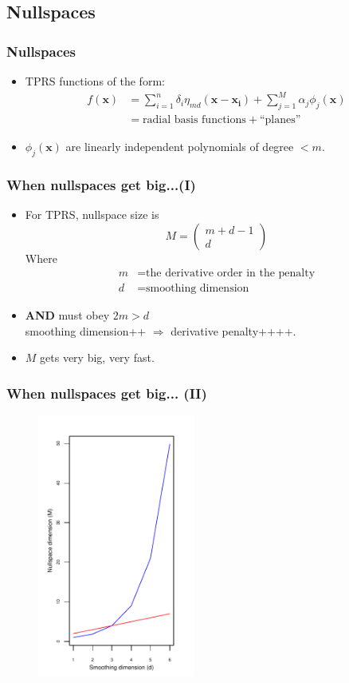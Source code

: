 \documentclass[ignorenonframetext]{beamer} %
\newcommand{\bi}{\begin{itemize}}
\newcommand{\ei}{\end{itemize}}
\begin{document}
\subsection{Nullspaces}

\begin{frame}
	\frametitle{Nullspaces}
	\bi
		\item TPRS functions of the form:
		\begin{align*}
		f(\mathbf{x}) &= \sum_{i=1}^n \delta_i \eta_{md}(\mathbf{x}-\mathbf{x_i}) + \sum_{j=1}^M \alpha_j \phi_j(\mathbf{x})\\
		&= \text{radial basis functions} + \text{``planes''}
		\end{align*}
		\item $\phi_j(\mathbf{x})$ are linearly independent polynomials of degree $< m$.
	\ei
\end{frame}


\begin{frame}
	\frametitle{When nullspaces get big...(I)}
	\bi
		\item For TPRS, nullspace size is 
		\begin{equation*}
			M=\begin{pmatrix} m+d-1 \\ d  \end{pmatrix}
		\end{equation*}
		Where \begin{align*}
				m &= \text{the derivative order in the penalty}\\
				d &= \text{smoothing dimension}
			\end{align*}
		\item \textbf{AND} must obey $2m>d$ \\smoothing dimension++ $\Rightarrow$ derivative penalty++++.
		\item $M$ gets very big, very fast.
	\ei
\end{frame}

\begin{frame}
	\frametitle{When nullspaces get big... (II)}
	\begin{figure}
	\centering
			\includegraphics[height=3.4in]{figs/nullspace-dim.pdf} 
	\end{figure}
\end{frame}
\end{document}
